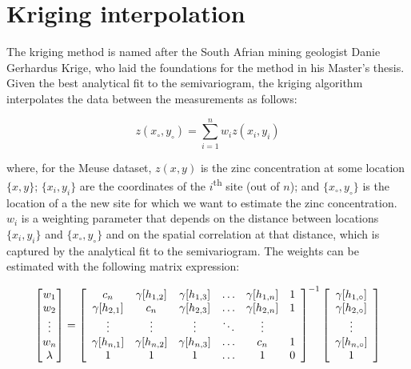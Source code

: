 \section{Kriging interpolation}
\label{sec:kriging}

The kriging method is named after the South Afrian mining geologist
Danie Gerhardus Krige, who laid the foundations for the method in his
Master's thesis.  Given the best analytical fit to the semivariogram,
the kriging algorithm interpolates the data between the measurements
as follows:

\begin{equation}
z(x_\circ,y_\circ) = \sum\limits_{i=1}^n w_i z(x_i,y_i)
\label{eq:kriging}
\end{equation}

\noindent where, for the Meuse dataset, $z(x,y)$ is the zinc
concentration at some location $\{x,y\}$; $\{x_i,y_i\}$ are the
coordinates of the $i$\textsuperscript{th} site (out of $n$); and
$\{x_\circ,y_\circ\}$ is the location of a the new site for which we
want to estimate the zinc concentration. $w_i$ is a weighting
parameter that depends on the distance between locations $\{x_i,y_i\}$
and $\{x_\circ,y_\circ\}$ and on the spatial correlation at that
distance, which is captured by the analytical fit to the
semivariogram. The weights can be estimated with the following matrix
expression:

\begin{equation}
  \left[
    \begin{array}{@{}c@{}}
      w_1 \\
      w_2 \\
      \vdots \\
      w_n \\
      \lambda
    \end{array}
    \right]
  =
  \left[
    \begin{array}{cccccc}
      c_n & \gamma[h_{1,2}] & \gamma[h_{1,3}] & \ldots & \gamma[h_{1,n}] & 1 \\
      \gamma[h_{2,1}] & c_n & \gamma[h_{2,3}] & \ldots & \gamma[h_{2,n}] & 1 \\
      \vdots & \vdots & \vdots & \ddots & \vdots \\
      \gamma[h_{n,1}] & \gamma[h_{n,2}] & \gamma[h_{n,3}] & \ldots & c_n & 1 \\
      1 & 1 & 1 & \ldots & 1 & 0 \\
    \end{array}
    \right]^{-1}
  \left[
    \begin{array}{c}
      \gamma[h_{1,\circ}] \\
      \gamma[h_{2,\circ}] \\
      \vdots \\
      \gamma[h_{n,\circ}]\\
      1
    \end{array}
    \right]
\label{eq:krigingweights}
\end{equation}

